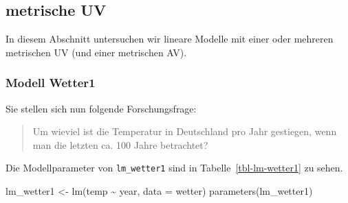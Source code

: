 \documentclass[
  letterpaper,
  oneside,
  open=any]{scrbook}
\newenvironment{Shaded}{\begin{snugshade}}{\end{snugshade}}
\newcommand{\AttributeTok}[1]{\textcolor[rgb]{0.40,0.45,0.13}{#1}}
\newcommand{\FunctionTok}[1]{\textcolor[rgb]{0.28,0.35,0.67}{#1}}
\newcommand{\NormalTok}[1]{\textcolor[rgb]{0.00,0.23,0.31}{#1}}
\newcommand{\OtherTok}[1]{\textcolor[rgb]{0.00,0.23,0.31}{#1}}
\newcommand{\SpecialCharTok}[1]{\textcolor[rgb]{0.37,0.37,0.37}{#1}}
\theoremstyle{definition}
\theoremstyle{definition}
\theoremstyle{definition}
\theoremstyle{remark}
\begin{document}
\subsection{metrische UV}\label{metrische-uv}

In diesem Abschnitt untersuchen wir lineare Modelle mit einer oder
mehreren metrischen UV (und einer metrischen AV).

\subsubsection{Modell Wetter1}\label{modell-wetter1}

Sie stellen sich nun folgende Forschungsfrage:

\begin{quote}
{} Um wieviel ist die Temperatur in Deutschland pro Jahr
gestiegen, wenn man die letzten ca. 100 Jahre betrachtet?
\end{quote}

Die Modellparameter von \texttt{lm\_wetter1} sind in
Tabelle~\ref{tbl-lm-wetter1} zu sehen.

\begin{Shaded}
\begin{Highlighting}[]
\NormalTok{lm\_wetter1 }\OtherTok{\textless{}{-}} \FunctionTok{lm}\NormalTok{(temp }\SpecialCharTok{\textasciitilde{}}\NormalTok{ year, }\AttributeTok{data =}\NormalTok{ wetter)}
\FunctionTok{parameters}\NormalTok{(lm\_wetter1)}
\end{Highlighting}
\end{Shaded}
\end{document}
